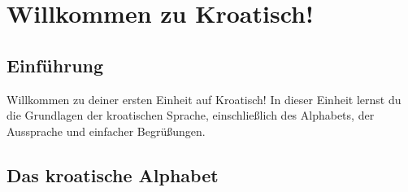 \chapter{Willkommen zu Kroatisch!}

\section{Einführung}
Willkommen zu deiner ersten Einheit auf Kroatisch! In dieser Einheit lernst du die Grundlagen der kroatischen Sprache, einschließlich des Alphabets, der Aussprache und einfacher Begrüßungen.

\section{Das kroatische Alphabet}

